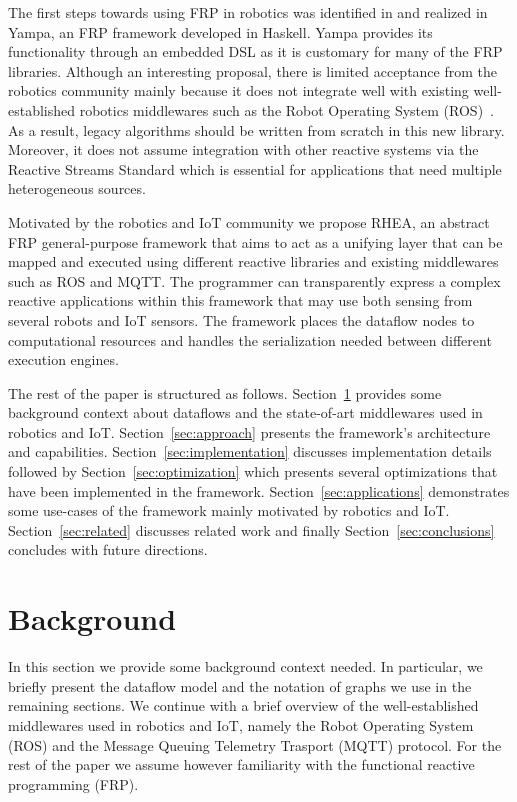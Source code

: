 \documentclass[sigplan,screen,review,anonymous]{acmart}
\begin{document}
The first steps towards using FRP in robotics was identified in \cite{arrows_robots}
and realized in Yampa, an FRP framework
developed in Haskell. Yampa provides its functionality through an embedded DSL
as it is customary for many of the FRP libraries. Although an interesting proposal,
there is limited acceptance from the robotics community mainly because it does
not integrate well with existing well-established robotics middlewares such as
the Robot Operating System (ROS)~\cite{ROS}. As a result, legacy algorithms should be
written from scratch in this new library. Moreover, it does not assume integration
with other reactive systems via the Reactive Streams Standard
which is essential for applications that need multiple heterogeneous sources.

Motivated by the robotics and IoT community we propose \textsc{RHEA}, an abstract
FRP general-purpose framework that aims to act as a unifying layer that can
be mapped and executed using different reactive libraries and existing middlewares
such as ROS and MQTT. The programmer can transparently express a complex reactive
applications within this framework that may use both sensing from several robots
and IoT sensors. The framework places the dataflow nodes to computational resources
and handles the serialization needed between different execution engines.

The rest of the paper is structured as follows.
Section~\ref{sec:background} provides some background context about dataflows and
the state-of-art middlewares used in robotics and IoT.
Section~\ref{sec:approach} presents the framework's architecture and capabilities.
Section~\ref{sec:implementation} discusses implementation details followed by
Section~\ref{sec:optimization} which presents several optimizations that have
been implemented in the framework. Section~\ref{sec:applications} demonstrates
some use-cases of the framework mainly motivated by robotics and IoT.
Section~\ref{sec:related} discusses related work and finally
Section~\ref{sec:conclusions} concludes with future directions.

\section{Background} \label{sec:background}
In this section we provide some background context needed. In particular, we
briefly present the dataflow model and the notation of graphs we use in the
remaining sections. We continue with a brief overview of the well-established
middlewares used in robotics and IoT, namely the Robot Operating System (ROS)
and the Message Queuing Telemetry Trasport (MQTT) protocol.
For the rest of the paper we assume however familiarity with the functional
reactive programming (FRP).
\end{document}
